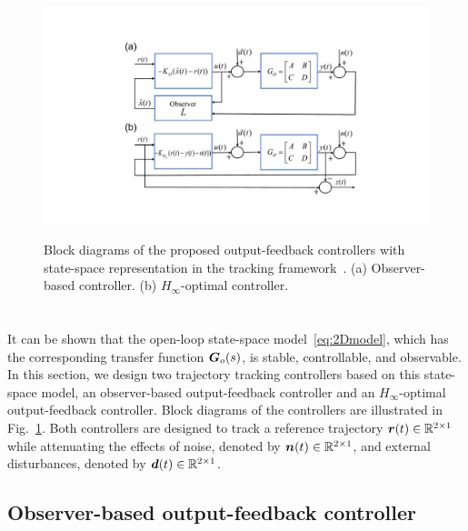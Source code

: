 \begin{figure}[h]
\centering
{\includegraphics[width=\textwidth]{output-feedback-control_block_final.pdf}}
\caption[]{Block diagrams of the proposed output-feedback controllers with state-space representation in the tracking framework~\cite{Skogestad2007}. (a) Observer-based controller. (b) $H_\infty$-optimal controller.} \vspace{-0.5cm}
\label{fig:control_block}
\end{figure}

\section{} 

It can be shown that the open-loop state-space model~\eqref{eq:2Dmodel}, which has the corresponding transfer function $\boldsymbol{G}_o(s)$, is stable, controllable, and observable. In this section, we design two trajectory tracking controllers based on this state-space model, an observer-based output-feedback controller and an $H_{\infty}$-optimal output-feedback controller. Block diagrams of the controllers are illustrated in Fig.~\ref{fig:control_block}. Both controllers are designed to track a reference trajectory $\boldsymbol{r}(t) \in \mathbb{R}^{2\times1}$ while attenuating the effects of noise, denoted by $\boldsymbol{n}(t)\in \mathbb{R}^{2\times1}$, and external disturbances, denoted by $\boldsymbol{d}(t)\in \mathbb{R}^{2\times1}$.

\subsection{Observer-based output-feedback controller}

